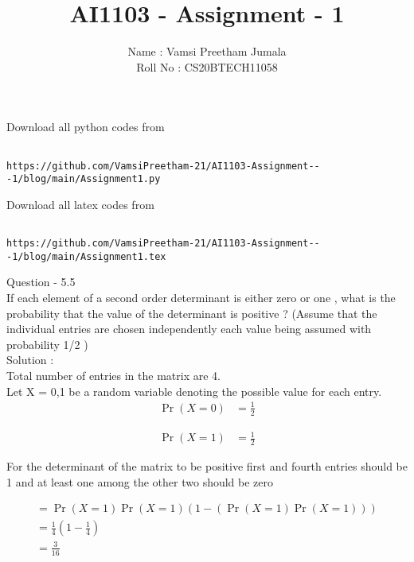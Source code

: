 \documentclass[journal,12pt,twocolumn]{IEEEtran}
\title{AI1103 - Assignment - 1}
\author{Name : Vamsi Preetham Jumala \\Roll No : CS20BTECH11058}
\begin{document}
\maketitle


Download all python codes from\\


\begin{lstlisting}

https://github.com/VamsiPreetham-21/AI1103-Assignment---1/blog/main/Assignment1.py

\end{lstlisting}


Download all latex codes from\\



\begin{lstlisting}

https://github.com/VamsiPreetham-21/AI1103-Assignment---1/blog/main/Assignment1.tex
\end{lstlisting}



Question - 5.5\\


If each element of a second order determinant is either zero or one , what is the probability that the value of the determinant is positive ? (Assume that the individual entries are chosen independently each value being assumed with probability 1/2 )\\


Solution :\\

Total number of entries in the matrix are 4.\\
Let X = {0,1} be a random variable denoting the possible value for each entry.\\
\begin{equation}
\label{eq1}
\begin{split}
\Pr(X=0) & = \frac{1}{2}
\end{split}
\end{equation}

\begin{equation}
\label{eq2}
\begin{split}
\Pr(X=1) & = \frac{1}{2}
\end{split}
\end{equation}


For the determinant of the matrix to be positive first and fourth entries should be 1 and at least one among the other two should be zero

\begin{equation}
\begin{split}
=\Pr(X=1)\Pr(X=1)(1-(\Pr(X=1)\Pr(X=1)))\\
=\frac{1}{4}(1-\frac{1}{4})\\
=\frac{3}{16}
\end{split}
\end{equation}
\end{document}
